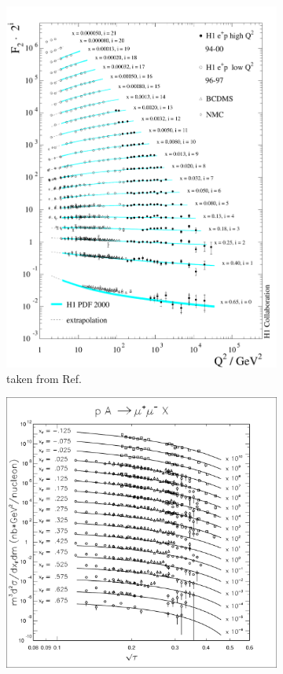 \begin{figure}[htbp!]
	\centering
	\begin{subfigure}{0.45\linewidth}
		\includegraphics[width=\linewidth]{images/DIS_scaling}
		\caption{taken from Ref.\ \cite{theh1collaboration2003}}
		\label{subfig:DIS_scaling}
	\end{subfigure}
	\begin{subfigure}{0.45\linewidth}
		\includegraphics[width=\linewidth]{images/DY_scaling}

\end{subfigure}
\end{figure}
